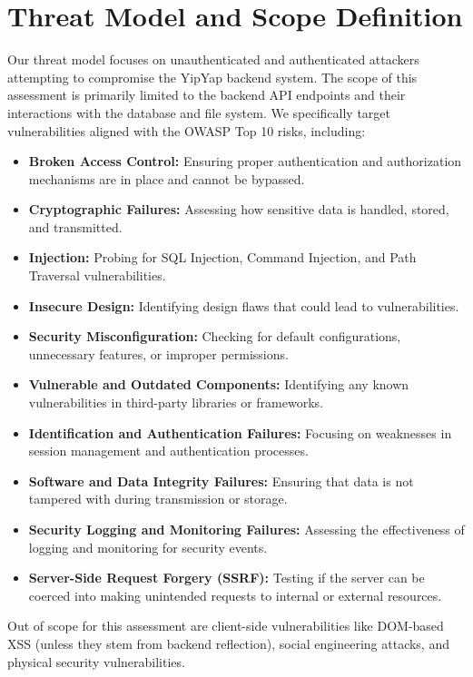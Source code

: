 \documentclass{article}
\begin{document}
\section{Threat Model and Scope Definition}
Our threat model focuses on unauthenticated and authenticated attackers attempting to compromise the YipYap backend system. The scope of this assessment is primarily limited to the backend API endpoints and their interactions with the database and file system. We specifically target vulnerabilities aligned with the OWASP Top 10 risks, including:
\begin{itemize}
    \item \textbf{Broken Access Control:} Ensuring proper authentication and authorization mechanisms are in place and cannot be bypassed.
    \item \textbf{Cryptographic Failures:} Assessing how sensitive data is handled, stored, and transmitted.
    \item \textbf{Injection:} Probing for SQL Injection, Command Injection, and Path Traversal vulnerabilities.
    \item \textbf{Insecure Design:} Identifying design flaws that could lead to vulnerabilities.
    \item \textbf{Security Misconfiguration:} Checking for default configurations, unnecessary features, or improper permissions.
    \item \textbf{Vulnerable and Outdated Components:} Identifying any known vulnerabilities in third-party libraries or frameworks.
    \item \textbf{Identification and Authentication Failures:} Focusing on weaknesses in session management and authentication processes.
    \item \textbf{Software and Data Integrity Failures:} Ensuring that data is not tampered with during transmission or storage.
    \item \textbf{Security Logging and Monitoring Failures:} Assessing the effectiveness of logging and monitoring for security events.
    \item \textbf{Server-Side Request Forgery (SSRF):} Testing if the server can be coerced into making unintended requests to internal or external resources.
\end{itemize}
Out of scope for this assessment are client-side vulnerabilities like DOM-based XSS (unless they stem from backend reflection), social engineering attacks, and physical security vulnerabilities.
\end{document}

